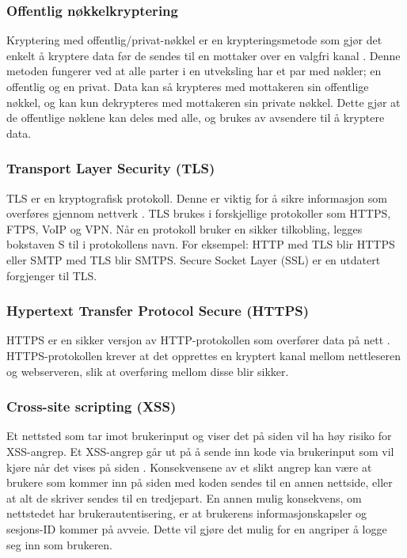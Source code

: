 \subsubsection{Offentlig nøkkelkryptering}
\label{sec:analysis-security-public_key-cryptography}
Kryptering med offentlig/privat-nøkkel er en krypteringsmetode som gjør det enkelt å kryptere data før de sendes til en mottaker over en valgfri kanal \cite[s.~58-60]{NattTomHeine2015Datasikkerhet}. Denne metoden fungerer ved at alle parter i en utveksling har et par med nøkler; en offentlig og en privat. Data kan så krypteres med mottakeren sin offentlige nøkkel, og kan kun dekrypteres med mottakeren sin private nøkkel. Dette gjør at de offentlige nøklene kan deles med alle, og brukes av avsendere til å kryptere data.
 
\subsubsection{Transport Layer Security (TLS)}
\label{sec:analysis-security-tls}
TLS er en kryptografisk protokoll. Denne er viktig for å sikre informasjon som overføres gjennom nettverk \cite{thomas2000ssl}. TLS brukes i forskjellige protokoller som HTTPS, FTPS, VoIP og VPN.
Når en protokoll bruker en sikker tilkobling, legges bokstaven S til i protokollens navn. For eksempel: HTTP med TLS blir HTTPS eller SMTP med TLS blir SMTPS.
Secure Socket Layer (SSL) er en utdatert forgjenger til TLS.
 
\subsubsection{Hypertext Transfer Protocol Secure (HTTPS)}
\label{sec:analysis-security-https}
HTTPS er en sikker versjon av HTTP-protokollen som overfører data på nett \cite{rfc26161999hypertext}. HTTPS-protokollen krever at det opprettes en kryptert kanal mellom nettleseren og webserveren, slik at overføring mellom disse blir sikker.

\subsubsection{Cross-site scripting (XSS)}
\label{sec:analysis-security-xss}
Et nettsted som tar imot brukerinput og viser det på siden vil ha høy risiko for XSS-angrep.
Et XSS-angrep går ut på å sende inn kode via brukerinput som vil kjøre når det vises på siden \cite[s.~179-183]{NattTomHeine2015Datasikkerhet}. Konsekvensene av et slikt angrep kan være at brukere som kommer inn på siden med koden sendes til en annen nettside, eller at alt de skriver sendes til en tredjepart. En annen mulig konsekvens, om nettstedet har brukerautentisering, er at brukerens informasjonskapsler og sesjons-ID kommer på avveie. Dette vil gjøre det mulig for en angriper å logge seg inn som brukeren.

